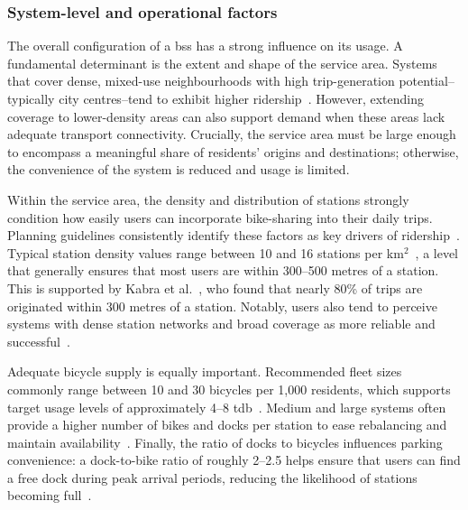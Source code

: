         
        \subsubsection{System-level and operational factors}

        The overall configuration of a \ac{bss} has a strong influence on its usage. A fundamental determinant is the extent and shape of the service area. Systems that cover dense, mixed-use neighbourhoods with high trip-generation potential--typically city centres--tend to exhibit higher ridership~\cite{Yanocha2018}. However, extending coverage to lower-density areas can also support demand when these areas lack adequate transport connectivity. Crucially, the service area must be large enough to encompass a meaningful share of residents’ origins and destinations; otherwise, the convenience of the system is reduced and usage is limited.

        Within the service area, the density and distribution of stations strongly condition how easily users can incorporate bike-sharing into their daily trips. Planning guidelines consistently identify these factors as key drivers of ridership~\cite{Yanocha2018, Ferrando2007, OBIS2011}. Typical station density values range between 10 and 16 stations per km$^{2}$~\cite{Yanocha2018, Ferrando2007, OBIS2011}, a level that generally ensures that most users are within 300–500 metres of a station. This is supported by Kabra et al.~\cite{Kabra2018}, who found that nearly 80\% of trips are originated within 300 metres of a station. Notably, users also tend to perceive systems with dense station networks and broad coverage as more reliable and successful~\cite{OBIS2011}.

        Adequate bicycle supply is equally important. Recommended fleet sizes commonly range between 10 and 30 bicycles per 1,000 residents, which supports target usage levels of approximately 4–8 \ac{tdb}~\cite{Yanocha2018}. Medium and large systems often provide a higher number of bikes and docks per station to ease rebalancing and maintain availability~\cite{OBIS2011}. Finally, the ratio of docks to bicycles influences parking convenience: a dock-to-bike ratio of roughly 2–2.5 helps ensure that users can find a free dock during peak arrival periods, reducing the likelihood of stations becoming full~\cite{Yanocha2018}.

